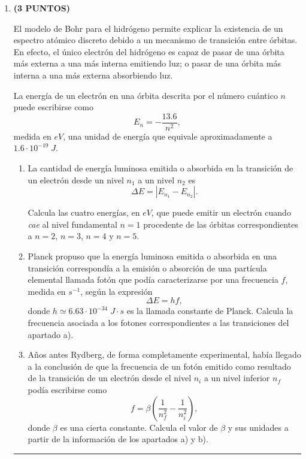 \documentclass[a4paper,14pt]{extarticle}
\newcommand{\halmos}{
\vspace*{-3ex}

\begin{flushright}
\rule{1mm}{2.5mm} \end{flushright}
}
\renewcommand{\qed}{\halmos}
\begin{document}
\begin{enumerate}
    Considera los elementos desconocidos $^{8}\alpha$, $^{18}\beta$, $^{34}\delta$ y $^{38}\epsilon.$ 
    	\begin{enumerate}[label=\alph*)]
    		\item Escribe las configuraciones electrónicas de los cuatro elementos. 
    		\item Justifica el tipo de enlace y la fórmula del compuesto que forman los elementos $\delta$ y $\epsilon$.
    		\item Justifica la existencia de la molécula $\alpha_2$ e indica el tipo de enlace que se produce.
    		\item Indica el tipo de enlace que formarán los elementos $\beta$ y $\alpha$.
    	\end{enumerate}
    \qed
    	
    
    \newpage
    
    \item \textbf{(3 PUNTOS)} 
    
    El modelo de Bohr para el hidrógeno permite explicar la existencia de un espectro atómico discreto debido a un mecanismo de transición entre órbitas. En efecto, el único electrón del hidrógeno es capaz de pasar de una órbita más externa a una más interna emitiendo luz; o pasar de una órbita más interna a una más externa absorbiendo luz.
    
    La energía de un electrón en una órbita descrita por el número cuántico $n$ puede escribirse como
    	$$E_n=-\frac{13.6}{n^2},$$
    medida en $eV$, una unidad de energía que equivale aproximadamente a $1.6\cdot 10^{-19}\;J$.
    		
    	\begin{enumerate}[label=\alph*)]
    		\item La cantidad de energía luminosa emitida o absorbida en la transición de un electrón desde un nivel $n_1$ a un nivel $n_2$ es $$\Delta E=|E_{n_1}-E_{n_2}|.$$
    		
    	 Calcula las cuatro energías, en $eV$, que puede emitir un electrón cuando \textit{cae} al nivel fundamental $n=1$ procedente de las órbitas correspondientes a $n=2$, $n=3$, $n=4$ y $n=5$.
    		\item Planck propuso que la energía luminosa emitida o absorbida en una transición correspondía a la emisión o absorción de una partícula elemental llamada fotón que podía caracterizarse por una frecuencia $f$, medida en $s^{-1}$, según la expresión 
    		$$\Delta E=hf,$$
    		donde $h\simeq 6.63\cdot 10^{-34}\;J\cdot s$ es la llamada constante de Planck. 
    		Calcula la frecuencia asociada a los fotones correspondientes a las transiciones del apartado a).
    		\item Años antes Rydberg, de forma completamente experimental, había llegado a la conclusión de que la frecuencia de un fotón emitido como resultado de la transición de un electrón desde el nivel $n_i$ a un nivel inferior $n_f$ podía escribirse como 
    		$$f=\beta\left(\frac{1}{n_f^2}-\frac{1}{n_i^2}\right),$$
    		donde $\beta$ es una cierta constante. Calcula el valor de $\beta$ y sus unidades a partir de la información de los apartados a) y b).
    	\end{enumerate}
		\qed    	

\end{enumerate}
\end{document}
